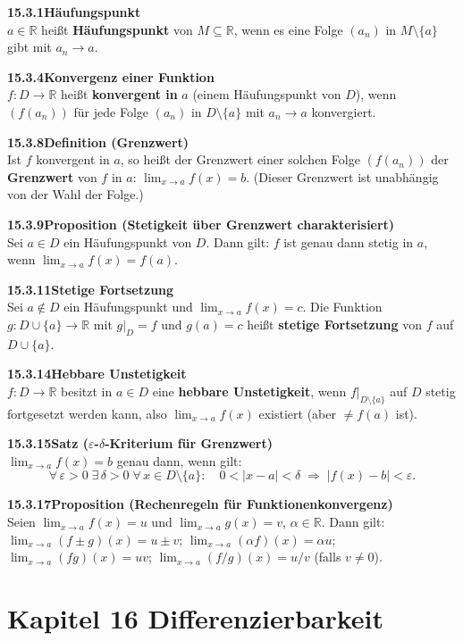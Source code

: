 \documentclass[a4paper,12pt]{article}
\newcommand{\gentry}[3]{%
  \noindent\textbf{#1\quad #2}\nopagebreak\\[0.2em]
  #3\par\smallskip
}
\begin{document}
\gentry{15.3.1}{Häufungspunkt}{%
  $a \in \mathbb{R}$ heißt \textbf{Häufungspunkt} von $M \subseteq \mathbb{R}$,
  wenn es eine Folge $(a_n)$ in $M \setminus \{a\}$ gibt mit $a_n \to a$.
}

\gentry{15.3.4}{Konvergenz einer Funktion}{%
  $f: D \to \mathbb{R}$ heißt \textbf{konvergent in} $a$ (einem Häufungspunkt von $D$),
  wenn $(f(a_n))$ für jede Folge $(a_n)$ in $D \setminus \{a\}$ mit $a_n \to a$
  konvergiert.
}

\gentry{15.3.8}{Definition (Grenzwert)}{%
  Ist $f$ konvergent in $a$, so heißt der Grenzwert einer solchen Folge
  $(f(a_n))$ der \textbf{Grenzwert} von $f$ in $a$:
  $\displaystyle\lim_{x \to a} f(x) = b$.
  (Dieser Grenzwert ist unabhängig von der Wahl der Folge.)
}

\gentry{15.3.9}{Proposition (Stetigkeit über Grenzwert charakterisiert)}{%
  Sei $a \in D$ ein Häufungspunkt von $D$. Dann gilt:
  $f$ ist genau dann stetig in $a$, wenn $\displaystyle\lim_{x \to a} f(x) = f(a)$.
}

\gentry{15.3.11}{Stetige Fortsetzung}{%
  Sei $a \notin D$ ein Häufungspunkt und $\lim_{x \to a} f(x) = c$.
  Die Funktion $g: D \cup \{a\} \to \mathbb{R}$ mit $g|_D = f$ und $g(a) = c$
  heißt \textbf{stetige Fortsetzung} von $f$ auf $D \cup \{a\}$.
}

\gentry{15.3.14}{Hebbare Unstetigkeit}{%
  $f: D \to \mathbb{R}$ besitzt in $a \in D$ eine \textbf{hebbare Unstetigkeit},
  wenn $f|_{D\setminus\{a\}}$ auf $D$ stetig fortgesetzt werden kann, also
  $\lim_{x \to a} f(x)$ existiert (aber $\neq f(a)$ ist).
}

\gentry{15.3.15}{Satz ($\varepsilon$-$\delta$-Kriterium für Grenzwert)}{%
  $\displaystyle\lim_{x \to a} f(x) = b$ genau dann, wenn gilt:
  \[
    \forall\, \varepsilon > 0 \;\exists\, \delta > 0 \;\forall\, x \in D \setminus \{a\}:
    \quad 0 < |x - a| < \delta \;\Rightarrow\; |f(x) - b| < \varepsilon.
  \]
}

\gentry{15.3.17}{Proposition (Rechenregeln für Funktionenkonvergenz)}{%
  Seien $\lim_{x\to a} f(x) = u$ und $\lim_{x \to a} g(x) = v$, $\alpha \in \mathbb{R}$.
  Dann gilt:
  $\lim_{x\to a}(f \pm g)(x) = u \pm v$;\;
  $\lim_{x\to a}(\alpha f)(x) = \alpha u$;\;
  $\lim_{x\to a}(fg)(x) = uv$;\;
  $\lim_{x\to a}(f/g)(x) = u/v$ (falls $v \neq 0$).
}

\section*{Kapitel 16 \quad Differenzierbarkeit}
\end{document}
